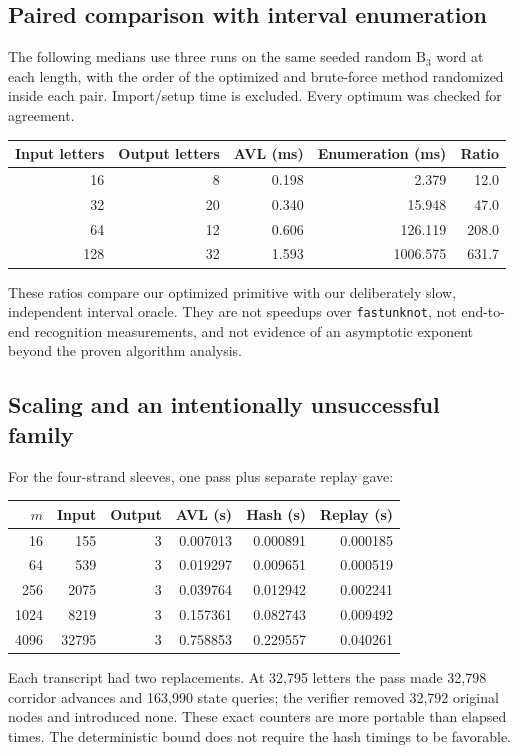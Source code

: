 \documentclass[11pt]{article}
\theoremstyle{definition}
\theoremstyle{remark}
\newcommand{\B}{\mathrm B}
\begin{document}
\subsection{Paired comparison with interval enumeration}
The following medians use three runs on the same seeded random $\B_3$ word
at each length, with the order of the optimized and brute-force method
randomized inside each pair. Import/setup time is excluded. Every optimum
was checked for agreement.
\begin{center}
\begin{tabular}{rrrrr}
\toprule
Input letters & Output letters & AVL (ms) & Enumeration (ms) & Ratio\\
\midrule
16 & 8  & 0.198 & 2.379 & 12.0\\
32 & 20 & 0.340 & 15.948 & 47.0\\
64 & 12 & 0.606 & 126.119 & 208.0\\
128& 32 & 1.593 & 1006.575 & 631.7\\
\bottomrule
\end{tabular}
\end{center}
These ratios compare our optimized primitive with our deliberately slow,
independent interval oracle. They are not speedups over
\texttt{fastunknot}, not end-to-end recognition measurements, and not evidence
of an asymptotic exponent beyond the proven algorithm analysis.

\subsection{Scaling and an intentionally unsuccessful family}
For the four-strand sleeves, one pass plus separate replay gave:
\begin{center}
\begin{tabular}{rrrrrr}
\toprule
$m$ & Input & Output & AVL (s) & Hash (s) & Replay (s)\\
\midrule
16   & 155   & 3 & 0.007013 & 0.000891 & 0.000185\\
64   & 539   & 3 & 0.019297 & 0.009651 & 0.000519\\
256  & 2075  & 3 & 0.039764 & 0.012942 & 0.002241\\
1024 & 8219  & 3 & 0.157361 & 0.082743 & 0.009492\\
4096 & 32795 & 3 & 0.758853 & 0.229557 & 0.040261\\
\bottomrule
\end{tabular}
\end{center}
Each transcript had two replacements. At 32,795 letters the pass made
32,798 corridor advances and 163,990 state queries; the verifier removed
32,792 original nodes and introduced none. These exact counters are more
portable than elapsed times. The deterministic bound does not require the
hash timings to be favorable.
\end{document}
